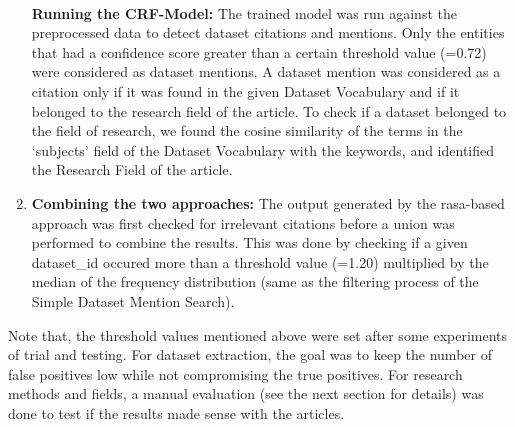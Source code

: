 \documentclass[runningheads]{llncs}
\begin{document}
\begin{enumerate}
\\
\textbf{Running the CRF-Model:} The trained model was run against the preprocessed data to detect dataset citations and mentions. Only the entities that had a confidence score greater than a certain threshold value (=0.72) were considered as dataset mentions. A dataset mention was considered as a citation only if it was found in the given Dataset Vocabulary and if it belonged to the research field of the article. %
To check if a dataset belonged to the field of research, we found the cosine similarity of the terms in the ‘subjects’ field of the Dataset Vocabulary with the keywords, and identified the Research Field of the article. 
\smallskip
\item \textbf{Combining the two approaches:}
The output generated by the rasa-based approach was first checked for irrelevant citations before a union was performed to combine the results. %
This was done by checking if a given dataset\_id occured more than a threshold value (=1.20) multiplied by the median of the frequency distribution (same as the filtering process of the Simple Dataset Mention Search). %
\end{enumerate} 

Note that, the threshold values mentioned above were set after some experiments of trial and testing. For dataset extraction, the goal was to keep the number of false positives low while not compromising the true positives. %
For research methods and fields, a manual evaluation (see the next section for details) was done to test if the results made sense with the articles.
\end{document}
